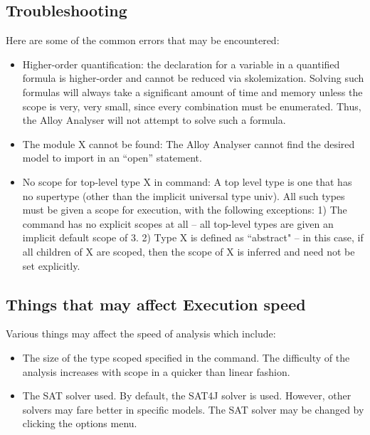\documentclass[a4paper,12pt]{extarticle}
\begin{document}
\subsection{Troubleshooting}
\label{Troubleshoot}
Here are some of the common errors that may be encountered:
\begin{itemize}
\item Higher-order quantification: the declaration for a variable in a quantified formula is higher-order and cannot be reduced via skolemization. Solving such formulas will always take a significant amount of time and memory unless the scope is very, very small, since every combination must be enumerated. Thus, the Alloy Analyser will not attempt to solve such a formula.
\item The module X cannot be found: The Alloy Analyser cannot find the desired model to import in an ``open” statement.
\item No scope for top-level type X in command: A top level type is one that has no supertype (other than the implicit universal type univ). All such types must be given a scope for execution, with the following exceptions: 1) The command has no explicit scopes at all – all top-level types are given an implicit default scope of 3.
2) Type X is defined as ``abstract" – in this case, if all children of X are scoped, then the scope of X is inferred and need not be set explicitly.
\end{itemize}
\subsection{Things that may affect Execution speed}
\label{Things affecting execution speed}
Various things may affect the speed of analysis which include:
\begin{itemize}
\item The size of the type scoped specified in the command. The difficulty of the analysis increases with scope in a quicker than linear fashion.
\item The SAT solver used. By default, the SAT4J solver is used. However, other solvers may fare better in specific models. The SAT solver may be changed by clicking the options menu.
\end{itemize}
\end{document}
